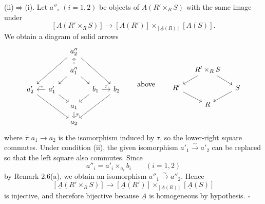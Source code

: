 (ii)$\Rightarrow$(i). Let $a''_i$ $(i=1,2)$ be objects of
$\underline A(R'\times_RS)$ with the same image under
\[
 [\underline A(R'\times_RS)]\longrightarrow
 [\underline A(R')]
 \times_{[\underline A(R)]}[\underline A(S)].
\]
We obtain a diagram of solid arrows
\[
\begin{tikzcd}[column sep=small,row sep=small]
 && a''_2 \arrow[ddll] \arrow[ddrr] &&\\
 && a''_1 \arrow[u,dashed] \arrow[dl] \arrow[dr] &&\\
 a'_2 \arrow[ddrr] & a'_1 \arrow[l,"{\sim}"'] \arrow[dr]
 && b_1 \arrow[r,"{\tau}"] \arrow[dl] & b_2 \arrow[ddll]\\
 && a_1 \arrow[d,"{\bar\tau}"] &&\\
 && a_2 &&
\end{tikzcd}
\qquad\text{above}\qquad
\begin{tikzcd}[column sep=small,row sep=small]
 & R'\times_RS \arrow[dl] \arrow[dr] &\\
 R' \arrow[dr] && S \arrow[dl]\\
 & R &
\end{tikzcd}
\]
where $\bar\tau:a_1\longrightarrow a_2$ is the isomorphism induced
by $\tau$, so the lower-right square commutes. Under condition (ii),
the given isomorphism $a'_1\xrightarrow{\sim}a'_2$ can be replaced
so that the left square also commutes. Since
\[
 a''_i=a'_i\times_{a_i}b_i\qquad(i=1,2)
\]
by Remark 2.6(a), we obtain an isomorphism
$a''_1\xrightarrow{\sim}a''_2$. Hence
\[
 [\underline A(R'\times_RS)]\longrightarrow
 [\underline A(R')]
 \times_{[\underline A(R)]}[\underline A(S)]
\]
is injective, and therefore bijective because $\underline A$ is
homogeneous by hypothesis. \hfill$\square$

